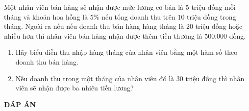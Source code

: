 \begin{bt}%
	Một nhân viên bán hàng sẽ nhận được mức lương cơ bản  là $5$ triệu đồng mỗi tháng và khoản hoa hồng là $5\%$ nếu tổng doanh thu trên $10$ triệu đồng trong tháng. Ngoài ra nếu nếu doanh thu bán hàng hàng tháng là $20$ triệu đồng hoặc nhiều hơn thì nhân viên bán hàng nhận được thêm tiền thưởng là $500.000$ đồng.
	\begin{enumerate}
		\item Hãy biểu diễn thu nhập hàng tháng của nhân viên bằng một hàm số theo doanh thu bán hàng.
		\item Nếu doanh thu trong một tháng của nhân viên đó là $30$ triệu đồng thì nhân viên sẽ nhận được ba nhiêu tiền lương?
	\end{enumerate}
\end{bt}
\begin{center}
	\textbf{ĐÁP ÁN}
\end{center}